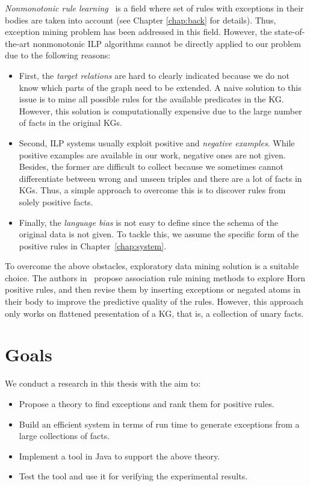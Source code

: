 \textit{Nonmonotonic rule learning}~\cite{ref11, ref40, ref41, ref32, ref42} is a field where set of rules with exceptions in their bodies are taken into account (see Chapter \ref{chap:back} for details). Thus, exception mining problem has been addressed in this field. However, the state-of-the-art nonmonotonic ILP algorithms cannot be directly applied to our problem due to the following reasons:
\begin{itemize}
\item First, the \textit{target relations} are hard to clearly indicated because we do not know which parts of the graph need to be extended. A naive solution to this issue is to mine all possible rules for the available predicates in the KG. However, this solution is computationally expensive due to the large number of facts in the original KGs.
\item Second, ILP systems usually exploit positive and \textit{negative examples}. While positive examples are available in our work, negative ones are not given. Besides, the former are difficult to collect because we sometimes cannot differentiate between wrong and unseen triples and there are a lot of facts in KGs. Thus, a simple approach to overcome this is to discover rules from solely positive facts.
\item Finally, the \textit{language bias} is not easy to define since the schema of the original data is not given. To tackle this, we assume the specific form of the positive rules in Chapter~\ref{chap:system}.
\end{itemize}

To overcome the above obstacles, exploratory data mining solution is a suitable choice. The authors in~\cite{ref12} propose association rule mining methods to explore Horn positive rules, and then revise them by inserting exceptions or negated atoms in their body to improve the predictive quality of the rules. However, this approach only works on flattened presentation of a KG, that is, a collection of unary facts.

\section{Goals}

We conduct a research in this thesis with the aim to:

\begin{itemize}
\item Propose a theory to find exceptions and rank them for positive rules.
\item Build an efficient system in terms of run time to generate exceptions from a large collections of facts.
\item Implement a tool in Java to support the above theory.
\item Test the tool and use it for verifying the experimental results.
\end{itemize}

